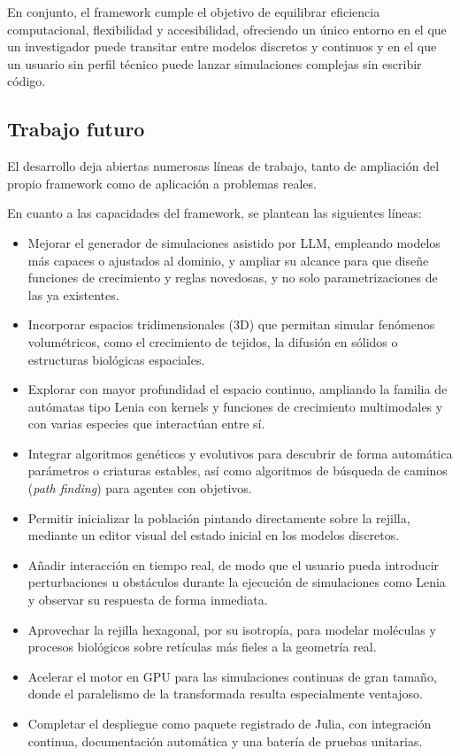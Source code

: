 \documentclass[runningheads]{llncs}
\begin{document}
En conjunto, el framework cumple el objetivo de equilibrar eficiencia computacional, flexibilidad y accesibilidad, ofreciendo un único entorno en el que un investigador puede transitar entre modelos discretos y continuos y en el que un usuario sin perfil técnico puede lanzar simulaciones complejas sin escribir código.

\subsection{Trabajo futuro}
El desarrollo deja abiertas numerosas líneas de trabajo, tanto de ampliación del propio framework como de aplicación a problemas reales.

En cuanto a las capacidades del framework, se plantean las siguientes líneas:
\begin{itemize}
    \item Mejorar el generador de simulaciones asistido por LLM, empleando modelos más capaces o ajustados al dominio, y ampliar su alcance para que diseñe funciones de crecimiento y reglas novedosas, y no solo parametrizaciones de las ya existentes.
    \item Incorporar espacios tridimensionales (3D) que permitan simular fenómenos volumétricos, como el crecimiento de tejidos, la difusión en sólidos o estructuras biológicas espaciales.
    \item Explorar con mayor profundidad el espacio continuo, ampliando la familia de autómatas tipo Lenia con kernels y funciones de crecimiento multimodales y con varias especies que interactúan entre sí.
    \item Integrar algoritmos genéticos y evolutivos para descubrir de forma automática parámetros o criaturas estables, así como algoritmos de búsqueda de caminos (\textit{path finding}) para agentes con objetivos.
    \item Permitir inicializar la población pintando directamente sobre la rejilla, mediante un editor visual del estado inicial en los modelos discretos.
    \item Añadir interacción en tiempo real, de modo que el usuario pueda introducir perturbaciones u obstáculos durante la ejecución de simulaciones como Lenia y observar su respuesta de forma inmediata.
    \item Aprovechar la rejilla hexagonal, por su isotropía, para modelar moléculas y procesos biológicos sobre retículas más fieles a la geometría real.
    \item Acelerar el motor en GPU para las simulaciones continuas de gran tamaño, donde el paralelismo de la transformada resulta especialmente ventajoso.
    \item Completar el despliegue como paquete registrado de Julia, con integración continua, documentación automática y una batería de pruebas unitarias.
\end{itemize}
\end{document}
